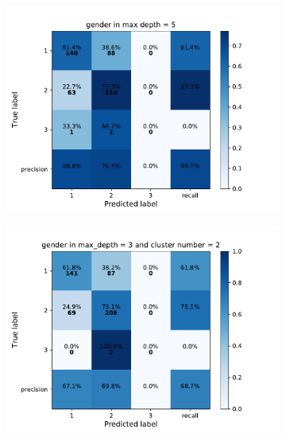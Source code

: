 {\begin{figure}[h]
    \centering
    \begin{subfigure}
      \centering
      \includegraphics[scale=0.45]{fig/super_rf_gender.pdf}
    \end{subfigure}%
    \begin{subfigure}
      \centering
      \includegraphics[scale=0.45]{fig/kms_rf_gender.pdf}
    \end{subfigure}
\end{figure}

}
